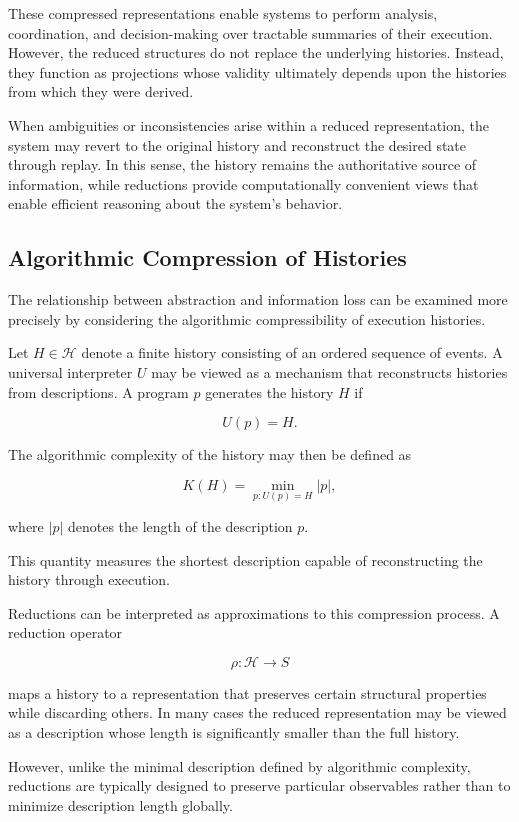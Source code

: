 \documentclass[12pt]{article}
\begin{document}
These compressed representations enable systems to
perform analysis, coordination, and decision-making
over tractable summaries of their execution. However,
the reduced structures do not replace the underlying
histories. Instead, they function as projections whose
validity ultimately depends upon the histories from
which they were derived.

When ambiguities or inconsistencies arise within a
reduced representation, the system may revert to the
original history and reconstruct the desired state
through replay. In this sense, the history remains the
authoritative source of information, while reductions
provide computationally convenient views that enable
efficient reasoning about the system's behavior.

\subsection{Algorithmic Compression of Histories}

The relationship between abstraction and information loss
can be examined more precisely by considering the
algorithmic compressibility of execution histories.

Let $H \in \mathcal{H}$ denote a finite history consisting
of an ordered sequence of events. A universal interpreter
$U$ may be viewed as a mechanism that reconstructs histories
from descriptions. A program $p$ generates the history $H$
if

\[
U(p) = H.
\]

The algorithmic complexity of the history may then be
defined as

\[
K(H) = \min_{p : U(p) = H} |p|,
\]

where $|p|$ denotes the length of the description $p$.

This quantity measures the shortest description capable
of reconstructing the history through execution.

Reductions can be interpreted as approximations to this
compression process. A reduction operator

\[
\rho : \mathcal{H} \rightarrow S
\]

maps a history to a representation that preserves
certain structural properties while discarding others.
In many cases the reduced representation may be viewed
as a description whose length is significantly smaller
than the full history.

However, unlike the minimal description defined by
algorithmic complexity, reductions are typically
designed to preserve particular observables rather
than to minimize description length globally.
\end{document}
